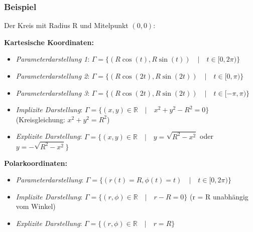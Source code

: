 \documentclass[11pt]{article} %
\begin{document}

\subsubsection{Beispiel}

Der Kreis mit Radius R und Mitelpunkt $(0,0)$:

{\bf Kartesische Koordinaten:}
\begin{itemize}
\item \emph{Parameterdarstellung 1}: $\Gamma = \{(R\cos (t), R \sin (t)) \quad | \quad t \in [0,2\pi) \}$
\item \emph{Parameterdarstellung 2}: $\Gamma = \{(R\cos (2t), R \sin (2t)) \quad | \quad t \in [0,\pi) \}$
\item \emph{Parameterdarstellung 3}: $\Gamma = \{(R\cos (2t), R \sin (2t)) \quad | \quad t \in [-\pi,\pi) \}$
\item \emph{Implizite Darstellung}: $\Gamma = \{(x,y) \in \mathbb{R} \quad | \quad x^2 + y^2 - R^2=0 \}$ \\(Kreisgleichung: $x^2 + y^2 = R^2$)
\item \emph{Explizite Darstellung}: $\Gamma = \{(x,y) \in \mathbb{R} \quad | \quad y = \sqrt{R^2 - x^2}$ oder $y = -\sqrt{R^2 - x^2} \}$
\end{itemize}

 {\bf Polarkoordinaten:}
\begin{itemize}
\item \emph{Parameterdarstellung}: $\Gamma = \{(r(t) = R, \phi(t) = t) \quad | \quad t \in [0,2\pi) \}$
\item \emph{Implizite Darstellung}: $\Gamma = \{(r,\phi) \in \mathbb{R} \quad | \quad r-R=0 \}$ (r = R unabhängig vom Winkel)
\item \emph{Explizite Darstellung}: $\Gamma = \{(r,\phi) \in \mathbb{R} \quad | \quad r=R \}$
\end{itemize}
\end{document}

